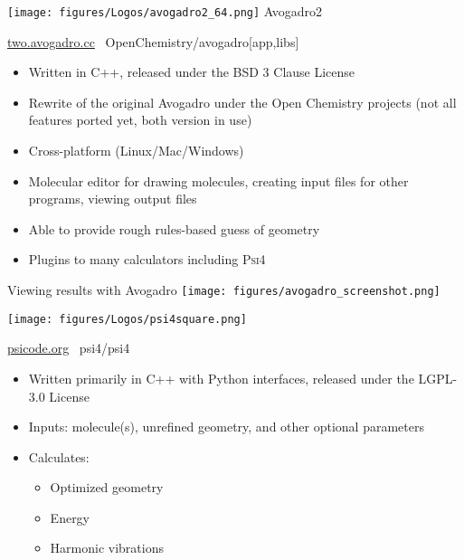 \begin{frame}{
 \hspace{-5mm}
 \texttt{[image: figures/Logos/avogadro2\_64.png]}
 Avogadro2
}

\url{two.avogadro.cc}
\hspace{10mm}
\ghinlinelogo\ OpenChemistry/avogadro[app,libs]

\vspace{5mm}

 \begin{itemize}
 \item Written in C++, released under the BSD 3 Clause License
 \item Rewrite of the original Avogadro under the Open Chemistry projects (not all features ported yet, both version in use)
 \item Cross-platform (Linux/Mac/Windows)
 \item Molecular editor for drawing molecules, creating input files for other programs, viewing output files
 \item Able to provide rough rules-based guess of geometry
 \item Plugins to many calculators including \textsc{Psi4}
\end{itemize}
\end{frame}

\begin{frame}{Viewing results with Avogadro}
\vspace{-5mm}
\centering
 \texttt{[image: figures/avogadro\_screenshot.png]}
\end{frame}


\begin{frame}{
 \hspace{-5mm}
 \texttt{[image: figures/Logos/psi4square.png]}
}

\url{psicode.org}
\hspace{10mm}
\ghinlinelogo\ psi4/psi4

\vspace{5mm}

\begin{itemize}
 \item Written primarily in C++ with Python interfaces, released under the LGPL-3.0 License
 \item  Inputs: molecule(s), unrefined geometry, and other optional parameters
 \item Calculates:
 	\begin{itemize}
 		\item Optimized geometry
 		\item Energy
 		\item Harmonic vibrations
 	\end{itemize}
\end{itemize}
\end{frame}

